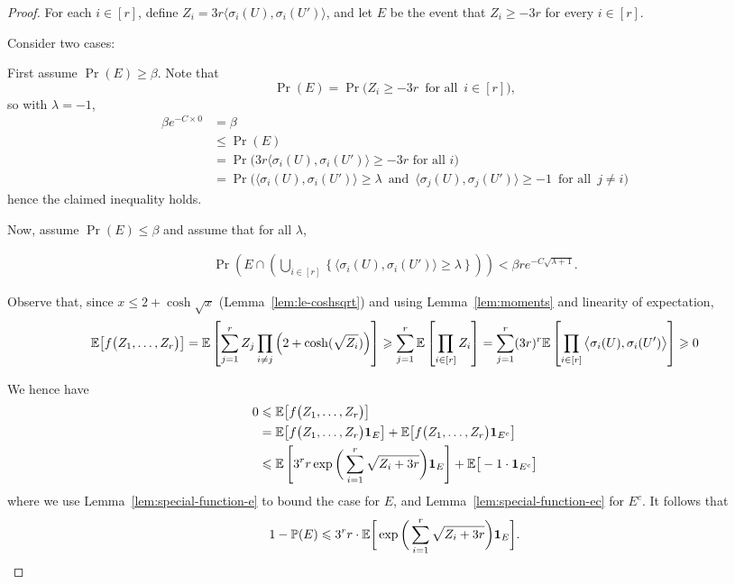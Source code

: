 \begin{proof}
  For each $i \in [r]$, define $Z_i = 3r\big\langle \sigma_i(U),\sigma_i(U') \big\rangle$, and let $E$ be the event that $Z_i \ge -3r$ for every $i \in [r]$.

  Consider two cases:

  First assume $\Pr(E) \ge \beta$. Note that
  $$\Pr(E) = \Pr\Big( Z_i \ge - 3r \, \text{ for all } \, i \in [r] \Big),$$
  so with $\lambda = -1$,
  \begin{align*}
    \beta e^{-C\times 0} &= \beta\\
    &\le \Pr(E)\\
    &= \Pr\Big(3r\big\langle \sigma_i(U),\sigma_i(U') \big\rangle \ge -3r \text{ for all }i\Big)\\
    &= \Pr\Big( \big\langle \sigma_i(U),\sigma_i(U') \big\rangle \ge \lambda \, \text{ and } \, \big\langle \sigma_j(U), \sigma_j(U') \big\rangle \ge -1 \, \text{ for all } \, j \ne i \Big)
  \end{align*}
  hence the claimed inequality holds.

  Now, assume $\Pr(E) \le \beta$ and assume that for all $\lambda$,

  \begin{align}\label{eq:max:big:and:E:no}
    \Pr\left(E \cap \left( \bigcup_{i \in [r]} \left\{ \big\langle \sigma_i(U),\sigma_i(U') \big\rangle \ge \lambda \right\}\right)\right) < \beta r e^{-C\sqrt{\lambda + 1}}.
  \end{align}

  Observe that, since $x \le 2 + \cosh\sqrt{x}$ (Lemma~\ref{lem:le-coshsqrt}) and using Lemma~\ref{lem:moments} and linearity of expectation,
  \[
    \mathbb{E}\big[ f\big( Z_1,\ldots,Z_r \big) \big] = \mathbb{E}\left[ \sum_{j = 1}^r Z_j \prod_{i \ne j} \left( 2 + \cosh(\sqrt{Z_i}) \right) \right]
    \geqslant \sum_{j = 1}^r \mathbb{E}\left[ \prod_{i \in [r]} Z_i \right] = \sum_{j = 1}^r (3r)^r \mathbb{E}\left[ \prod_{i \in [r]} \big\langle \sigma_i(U),\sigma_i(U') \big\rangle \right] \geqslant 0
  \]

  We hence have
  \begin{align*}
    0 &\leqslant \mathbb{E}\big[ f\big( Z_1,\ldots,Z_r \big) \big]\\
    &= \mathbb{E}\big[ f\big( Z_1,\ldots,Z_r \big)  \mathbf{1}_E \big] + \mathbb{E}\big[ f\big( Z_1,\ldots,Z_r \big) \mathbf{1}_{E^c} \big]\\
    &\leqslant \mathbb{E}\left[ 3^r r \exp\bigg( \displaystyle\sum_{i = 1}^r \sqrt{ Z_i + 3r } \bigg)  \mathbf{1}_E \right] + \mathbb{E}\big[-1 \cdot \mathbf{1}_{E^c} \big]
  \end{align*}
  where we use Lemma~\ref{lem:special-function-e} to bound the case for $E$, and Lemma~\ref{lem:special-function-ec} for $E^c$.
  It follows that
  \begin{equation}\label{eq:eventE:inequality}
    1 - \mathbb{P}(E) \leqslant 3^r r \cdot \mathbb{E}\bigg[ \exp\bigg( \sum_{i = 1}^r \sqrt{ Z_i + 3r } \bigg) \mathbf{1}_E \bigg].
  \end{equation}


\end{proof}
